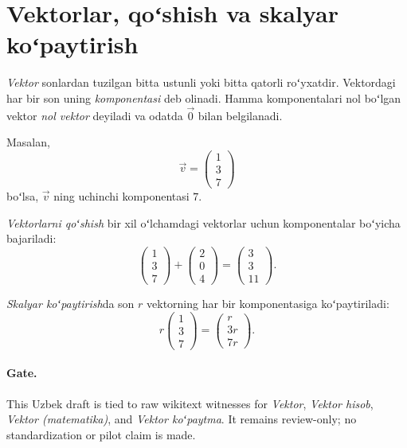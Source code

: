 \documentclass[12pt]{article}
\begin{document}
\section*{Vektorlar, qoʻshish va skalyar koʻpaytirish}

\emph{Vektor} sonlardan tuzilgan bitta ustunli yoki bitta qatorli roʻyxatdir. Vektordagi har bir son uning \emph{komponentasi} deb olinadi. Hamma komponentalari nol boʻlgan vektor \emph{nol vektor} deyiladi va odatda \(\vec{0}\) bilan belgilanadi.

Masalan,
\[
  \vec{v}=\begin{pmatrix}1\\3\\7\end{pmatrix}
\]
boʻlsa, \(\vec{v}\) ning uchinchi komponentasi \(7\).

\emph{Vektorlarni qoʻshish} bir xil oʻlchamdagi vektorlar uchun komponentalar boʻyicha bajariladi:
\[
  \begin{pmatrix}1\\3\\7\end{pmatrix}+
  \begin{pmatrix}2\\0\\4\end{pmatrix}
  =
  \begin{pmatrix}3\\3\\11\end{pmatrix}.
\]

\emph{Skalyar koʻpaytirish}da son \(r\) vektorning har bir komponentasiga koʻpaytiriladi:
\[
  r\begin{pmatrix}1\\3\\7\end{pmatrix}
  =
  \begin{pmatrix}r\\3r\\7r\end{pmatrix}.
\]

\paragraph{Gate.} This Uzbek draft is tied to raw wikitext witnesses for \emph{Vektor}, \emph{Vektor hisob}, \emph{Vektor (matematika)}, and \emph{Vektor koʻpaytma}. It remains review-only; no standardization or pilot claim is made.
\end{document}
